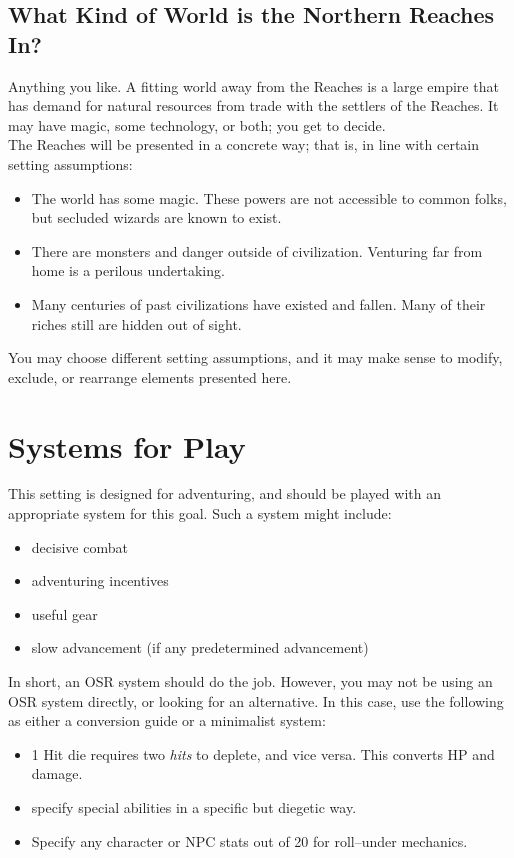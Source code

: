 \documentclass[notitlepage]{article}
\begin{document}
\begin{multicols}{2}
\subsection*{What Kind of World is the Northern Reaches In?}

Anything you like.
A fitting world away from the Reaches is a large empire that has demand for natural resources from trade with the settlers of the Reaches.
It may have magic, some technology, or both; you get to decide. \\

The Reaches will be presented in a concrete way; that is, in line with certain setting assumptions:

\begin{itemize}
\item The world has some magic. These powers are not accessible to common folks, but secluded wizards are known to exist.
\item There are monsters and danger outside of civilization. Venturing far from home is a perilous undertaking.
\item Many centuries of past civilizations have existed and fallen. Many of their riches still are hidden out of sight. 
\end{itemize}

You may choose different setting assumptions, and it may make sense to modify, exclude, or rearrange elements presented here.


\section{Systems for Play}

This setting is designed for adventuring, and should be played with an appropriate system for this goal.
Such a system might include:

\begin{itemize}
\item decisive combat
\item adventuring incentives
\item useful gear
\item slow advancement (if any predetermined advancement)
\end{itemize}

In short, an OSR system should do the job.
However, you may not be using an OSR system directly, or looking for an alternative.
In this case, use the following as either a conversion guide or a minimalist system:

\begin{itemize}
\item 1 Hit die requires two \emph{hits} to deplete, and vice versa. This converts HP and damage.
\item specify special abilities in a specific but diegetic way.
\item Specify any character or NPC stats out of 20 for roll--under mechanics.
\end{itemize}


\end{multicols}
\end{document}

